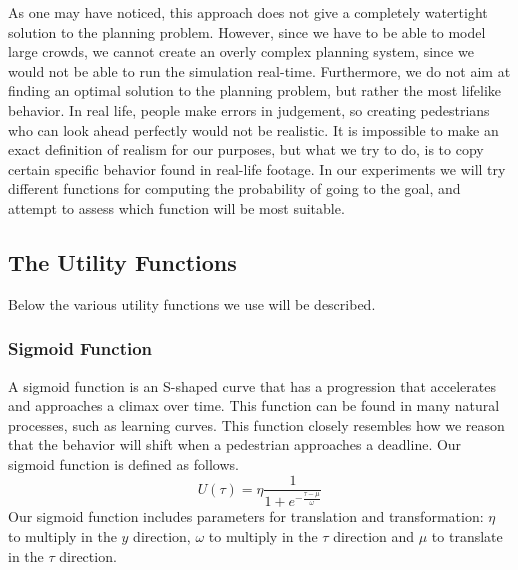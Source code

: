 \documentclass[11pt, a4paper]{book}
\begin{document}
As one may have noticed, this approach does not give a completely watertight solution to the planning problem. However, since we have to be able to model large crowds, we cannot create an overly complex planning system, since we would not be able to run the simulation real-time. Furthermore, we do not aim at finding an optimal solution to the planning problem, but rather the most lifelike behavior. In real life, people make errors in judgement, so creating pedestrians who can look ahead perfectly would not be realistic. It is impossible to make an exact definition of realism for our purposes, but what we try to do, is to copy certain specific behavior found in real-life footage. In our experiments we will try different functions for computing the probability of going to the goal, and attempt to assess which function will be most suitable.


\subsection{The Utility Functions}
\label{subsec:utility}
Below the various utility functions we use will be described. 

\subsubsection{Sigmoid Function}
A sigmoid function is an S-shaped curve that has a progression that accelerates and approaches a climax over time. This function can be found in many natural processes, such as learning curves. This function closely resembles how we reason that the behavior will shift when a pedestrian approaches a deadline.
Our sigmoid function is defined as follows.
\begin{equation}
U(\tau) = \eta \frac{1}{1+e^{-\frac{\tau-\mu}{\omega}}} 
\end{equation}
Our sigmoid function includes parameters for translation and transformation: $\eta$ to multiply in the $y$ direction, $\omega$ to multiply in the $\tau$ direction and $\mu$ to translate in the $\tau$ direction.

\end{document}

